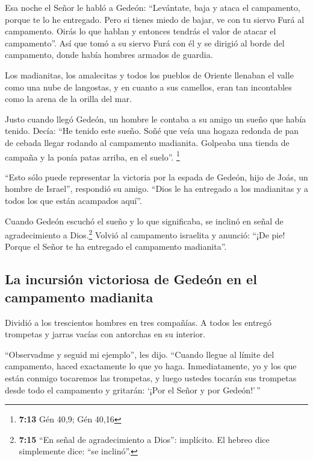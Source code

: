  Esa noche el Señor le habló a Gedeón: ``Levántate, baja y
ataca el campamento, porque te lo he entregado.  Pero si
tienes miedo de bajar, ve con tu siervo Furá al campamento.
 Oirás lo que hablan y entonces tendrás el valor de
atacar el campamento''. Así que tomó a su siervo Furá con él y se
dirigió al borde del campamento, donde había hombres armados de guardia.

 Los madianitas, los amalecitas y todos los pueblos de
Oriente llenaban el valle como una nube de langostas, y en cuanto a sus
camellos, eran tan incontables como la arena de la orilla del mar.

 Justo cuando llegó Gedeón, un hombre le contaba a su
amigo un sueño que había tenido. Decía: ``He tenido este sueño. Soñé que
veía una hogaza redonda de pan de cebada llegar rodando al campamento
madianita. Golpeaba una tienda de campaña y la ponía patas arriba, en el
suelo''. \footnote{\textbf{7:13} Gén 40,9; Gén 40,16}

 ``Esto sólo puede representar la victoria por la espada
de Gedeón, hijo de Joás, un hombre de Israel'', respondió su amigo.
``Dios le ha entregado a los madianitas y a todos los que están
acampados aquí''.

 Cuando Gedeón escuchó el sueño y lo que significaba, se
inclinó en señal de agradecimiento a Dios.\footnote{\textbf{7:15} ``En
  señal de agradecimiento a Dios'': implícito. El hebreo dice
  simplemente dice: ``se inclinó''.} Volvió al campamento israelita y
anunció: ``¡De pie! Porque el Señor te ha entregado el campamento
madianita''.

\hypertarget{la-incursiuxf3n-victoriosa-de-gedeuxf3n-en-el-campamento-madianita}{%
\subsection{La incursión victoriosa de Gedeón en el campamento
madianita}\label{la-incursiuxf3n-victoriosa-de-gedeuxf3n-en-el-campamento-madianita}}

 Dividió a los trescientos hombres en tres compañías. A
todos les entregó trompetas y jarras vacías con antorchas en su
interior.

 ``Observadme y seguid mi ejemplo'', les dijo. ``Cuando
llegue al límite del campamento, haced exactamente lo que yo haga.
 Inmediatamente, yo y los que están conmigo tocaremos las
trompetas, y luego ustedes tocarán sus trompetas desde todo el
campamento y gritarán: `¡Por el Señor y por Gedeón!'\,''

